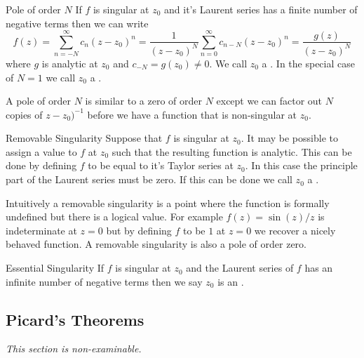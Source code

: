 \documentclass{article}
\begin{document}
    \begin{definition}{Pole of order \(N\)}{}
        If \(f\) is singular at \(z_0\) and it's Laurent series has a finite number of negative terms then we can write
        \[f(z) = \sum_{n=-N}^{\infty} c_n(z - z_0)^n = \frac{1}{(z - z_0)^N} \sum_{n=0}^{\infty} c_{n-N}(z - z_0)^n = \frac{g(z)}{(z - z_0)^N}\]
        where \(g\) is analytic at \(z_0\) and \(c_{-N} = g(z_0) \ne 0\).
        We call \(z_0\) a .
        In the special case of \(N = 1\) we call \(z_0\) a .
    \end{definition}
    A pole of order \(N\) is similar to a zero of order \(N\) except we can factor out \(N\) copies of \(z - z_0)^{-1}\) before we have a function that is non-singular at \(z_0\).
    
    \begin{definition}{Removable Singularity}{}
        Suppose that \(f\) is singular at \(z_0\).
        It may be possible to assign a value to \(f\) at \(z_0\) such that the resulting function is analytic.
        This can be done by defining \(f\) to be equal to it's Taylor series at \(z_0\).
        In this case the principle part of the Laurent series must be zero.
        If this can be done we call \(z_0\) a .
    \end{definition}
    Intuitively a removable singularity is a point where the function is formally undefined but there is a logical value.
    For example \(f(z) = \sin(z)/z\) is indeterminate at \(z = 0\) but by defining \(f\) to be \(1\) at \(z = 0\) we recover a nicely behaved function.
    A removable singularity is also a pole of order zero.
    
    \begin{definition}{Essential Singularity}{}
        If \(f\) is singular at \(z_0\) and the Laurent series of \(f\) has an infinite number of negative terms then we say \(z_0\) is an .
    \end{definition}
    
    \subsection{Picard's Theorems}
    \emph{This section is non-examinable.}
    
\end{document}
